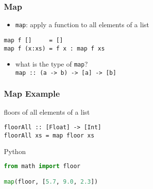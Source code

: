 \documentclass[dvipsnames]{beamer}
\theoremstyle{plain}
\begin{document}
\begin{frame}[fragile]
  \frametitle{Map}

  \begin{itemize}
    \item \lstinline|map|: apply a function to all elements of a list
  \end{itemize}

  \begin{exampleblock}{}
    \begin{lstlisting}[deletekeywords={map}]
map f []     = []
map f (x:xs) = f x : map f xs
    \end{lstlisting}
  \end{exampleblock}

  \pause
  \begin{itemize}
    \item what is the type of \lstinline|map|?\\
      \lstinline|map :: (a -> b) -> [a] -> [b]|
  \end{itemize}
\end{frame}

\begin{frame}[fragile]
  \frametitle{Map Example}

  \begin{exampleblock}{floors of all elements of a list}
    \begin{lstlisting}
floorAll :: [Float] -> [Int]
floorAll xs = map floor xs
    \end{lstlisting}
  \end{exampleblock}

  \bigskip
  \begin{exampleblock}{Python}
    \begin{lstlisting}[language=Python]
from math import floor

map(floor, [5.7, 9.0, 2.3])
    \end{lstlisting}
  \end{exampleblock}
\end{frame}
\end{document}
